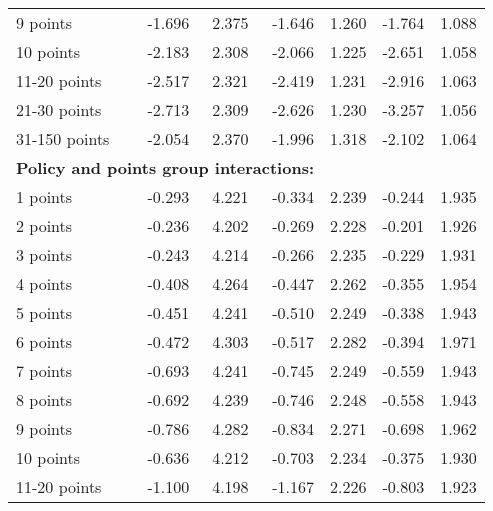 \begin{table}
\begin{tabular}{l r r r r r r}
9 points  & -1.696  &  2.375  & -1.646  &  1.260  & -1.764  &  1.088   \\ 
 
10 points  & -2.183  &  2.308  & -2.066  &  1.225  & -2.651  &  1.058   \\ 
 
11-20 points  & -2.517  &  2.321  & -2.419  &  1.231  & -2.916  &  1.063   \\ 
 
21-30 points  & -2.713  &  2.309  & -2.626  &  1.230  & -3.257  &  1.056   \\ 
 
31-150 points  & -2.054  &  2.370  & -1.996  &  1.318  & -2.102  &  1.064   \\ 
 

\hline 
 
\multicolumn{4}{l}{\textbf{Policy and points group interactions:}}  \\ 
 
1 points  & -0.293  &  4.221  & -0.334  &  2.239  & -0.244  &  1.935   \\ 
 
2 points  & -0.236  &  4.202  & -0.269  &  2.228  & -0.201  &  1.926   \\ 
 
3 points  & -0.243  &  4.214  & -0.266  &  2.235  & -0.229  &  1.931   \\ 
 
4 points  & -0.408  &  4.264  & -0.447  &  2.262  & -0.355  &  1.954   \\ 
 
5 points  & -0.451  &  4.241  & -0.510  &  2.249  & -0.338  &  1.943   \\ 
 
6 points  & -0.472  &  4.303  & -0.517  &  2.282  & -0.394  &  1.971   \\ 
 
7 points  & -0.693  &  4.241  & -0.745  &  2.249  & -0.559  &  1.943   \\ 
 
8 points  & -0.692  &  4.239  & -0.746  &  2.248  & -0.558  &  1.943   \\ 
 
9 points  & -0.786  &  4.282  & -0.834  &  2.271  & -0.698  &  1.962   \\ 
 
10 points  & -0.636  &  4.212  & -0.703  &  2.234  & -0.375  &  1.930   \\ 
 
11-20 points  & -1.100  &  4.198  & -1.167  &  2.226  & -0.803  &  1.923   \\ 
 

\end{tabular}
\end{table}
